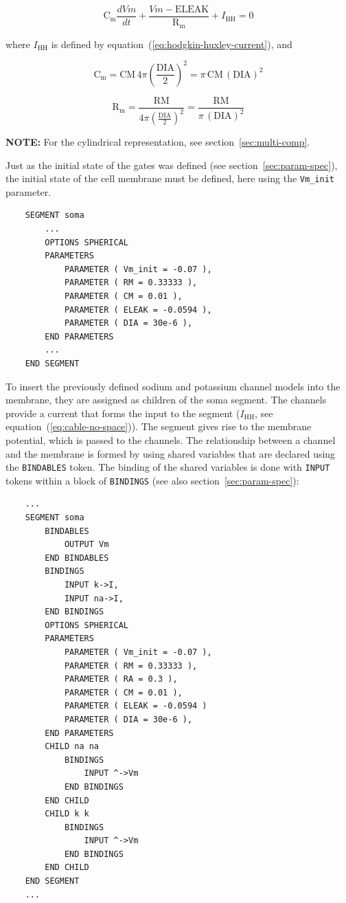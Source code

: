 \documentclass[12pt]{article}
\begin{document}
\begin{equation}
  \label{eq:cable-no-space}
  \mathrm{C_m} \frac{dVm}{dt} + \frac{Vm - \mathrm{ELEAK}}{\mathrm{R_m}} + I_{\mathrm{HH}} = 0
\end{equation}

where $I_{\mathrm{HH}}$ is defined by
equation~(\ref{eq:hodgkin-huxley-current}), and

\begin{equation}
  \label{eq:cable-no-space-cm}
  \mathrm{C_m} = \mathrm{CM} \, 4 \pi \left( \frac{\mathrm{DIA}}{2} \right) ^2 = \pi \, \mathrm{CM} \, (\mathrm{DIA}) ^2
\end{equation}

\begin{equation}
  \label{eq:cable-no-space-rm}
  \mathrm{R_m} = \frac{\mathrm{RM}}{4 \pi \left( \frac{\mathrm{DIA}}{2} \right) ^2} = \frac{\mathrm{RM}}{\pi \, (\mathrm{DIA}) ^2}
\end{equation}

{\bf NOTE:} For the cylindrical representation, see section~\ref{sec:multi-comp}.

Just as the initial state of the gates was defined (see
section~\ref{sec:param-spec}), the initial state of the cell membrane
must be defined, here using the {\tt Vm\_init} parameter.

\begin{verbatim}
    SEGMENT soma
        ...
        OPTIONS SPHERICAL
        PARAMETERS
            PARAMETER ( Vm_init = -0.07 ),
            PARAMETER ( RM = 0.33333 ),
            PARAMETER ( CM = 0.01 ),
            PARAMETER ( ELEAK = -0.0594 ),
            PARAMETER ( DIA = 30e-6 ),
        END PARAMETERS
        ...
    END SEGMENT
\end{verbatim}

To insert the previously defined sodium and potassium channel models
into the membrane, they are assigned as children of the soma segment.
The channels provide a current that forms the input to the segment
($I_\mathrm{HH}$, see equation~(\ref{eq:cable-no-space})).  The segment
gives rise to the membrane potential, which is passed to the channels.
The relationship between a channel and the membrane is formed by using
shared variables that are declared using the {\tt BINDABLES} token.
The binding of the shared variables is done with {\tt INPUT} tokens
within a block of {\tt BINDINGS} (see also
section~\ref{sec:param-spec}):

\begin{verbatim}
    ...
    SEGMENT soma
        BINDABLES
            OUTPUT Vm
        END BINDABLES
        BINDINGS
            INPUT k->I,
            INPUT na->I,
        END BINDINGS
        OPTIONS SPHERICAL
        PARAMETERS
            PARAMETER ( Vm_init = -0.07 ),
            PARAMETER ( RM = 0.33333 ),
            PARAMETER ( RA = 0.3 ),
            PARAMETER ( CM = 0.01 ),
            PARAMETER ( ELEAK = -0.0594 )
            PARAMETER ( DIA = 30e-6 ),
        END PARAMETERS
        CHILD na na
            BINDINGS
                INPUT ^->Vm
            END BINDINGS
        END CHILD
        CHILD k k
            BINDINGS
                INPUT ^->Vm
            END BINDINGS
        END CHILD
    END SEGMENT
    ...
\end{verbatim}
\end{document}
